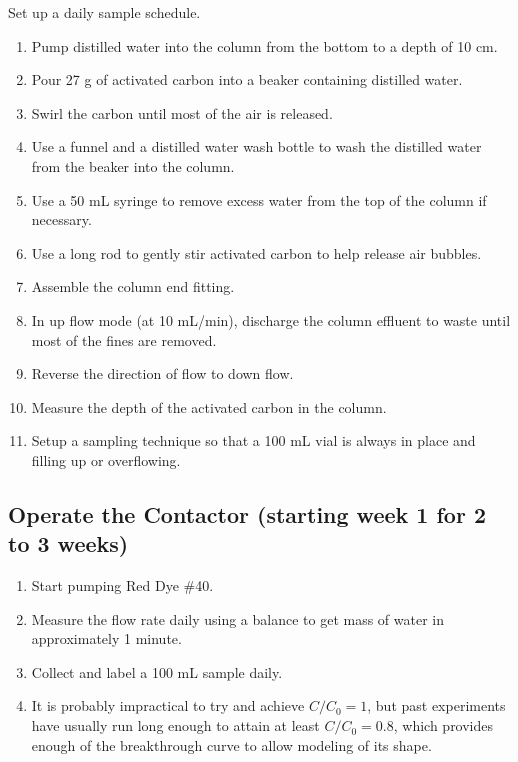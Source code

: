 \documentclass[letterpaper,10pt,english]{sphinxmanual}
\begin{document}
Set up a daily sample schedule.
\begin{enumerate}
\item {} 
Pump distilled water into the column from the bottom to a depth of 10 cm.

\item {} 
Pour 27 g of activated carbon into a beaker containing distilled water.

\item {} 
Swirl the carbon until most of the air is released.

\item {} 
Use a funnel and a distilled water wash bottle to wash the distilled water from the beaker into the column.

\item {} 
Use a 50 mL syringe to remove excess water from the top of the column if necessary.

\item {} 
Use a long rod to gently stir activated carbon to help release air bubbles.

\item {} 
Assemble the column end fitting.

\item {} 
In up flow mode (at 10 mL/min), discharge the column effluent to waste until most of the fines are removed.

\item {} 
Reverse the direction of flow to down flow.

\item {} 
Measure the depth of the activated carbon in the column.

\item {} 
Setup a sampling technique so that a 100 mL vial is always in place and filling up or overflowing.

\end{enumerate}


\subsection{Operate the Contactor (starting week 1 for 2 to 3 weeks)}
\label{\detokenize{Adsorption/Adsorption:operate-the-contactor-starting-week-1-for-2-to-3-weeks}}\begin{enumerate}
\item {} 
Start pumping Red Dye \#40.

\item {} 
Measure the flow rate daily using a balance to get mass of water in approximately 1 minute.

\item {} 
Collect and label a 100 mL sample daily.

\item {} 
It is probably impractical to try and achieve \(C/C_0 = 1\), but past experiments have usually run long enough to attain at least \(C/C_0 = 0.8\), which provides enough of the breakthrough curve to allow modeling of its shape.

\end{enumerate}
\end{document}
